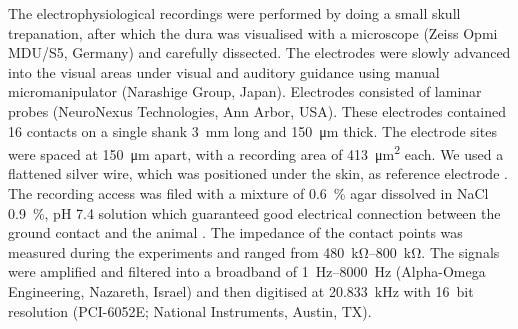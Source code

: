 The electrophysiological recordings were performed by doing a small skull trepanation, after which the dura was visualised with a microscope (Zeiss Opmi MDU/S5, Germany) and carefully dissected.
The electrodes were slowly advanced into the visual areas under visual and auditory guidance using manual micromanipulator (Narashige Group, Japan).
Electrodes consisted of laminar probes (NeuroNexus Technologies, Ann Arbor, USA).
These electrodes contained \num{16} contacts on a single shank \SI{3}{\milli\metre} long and \SI{150}{\micro\metre} thick.
The electrode sites were spaced at \SI{150}{\micro\metre} apart, with a recording area of \SI{413}{\micro\metre^2} each.
We used a flattened silver wire, which was positioned under the skin, as reference electrode \citep{Murayama2010}.
The recording access was filed with a mixture of \SI{0.6}{\percent} agar dissolved in \ac{NaCl} \SI{0.9}{\percent}, pH 7.4 solution which guaranteed good electrical connection between the ground contact and the animal \citep{Oeltermann2007760}.
The impedance of the contact points was measured during the experiments and ranged from \SIrange{480}{800}{\kilo\ohm}.
The signals were amplified and filtered into a broadband of \SIrange{1}{8000}{Hz} (Alpha-Omega Engineering, Nazareth, Israel) and then digitised at \SI{20.833}{\kilo\Hz} with \SI{16}{bit} resolution (PCI-6052E; National Instruments, Austin, TX).


